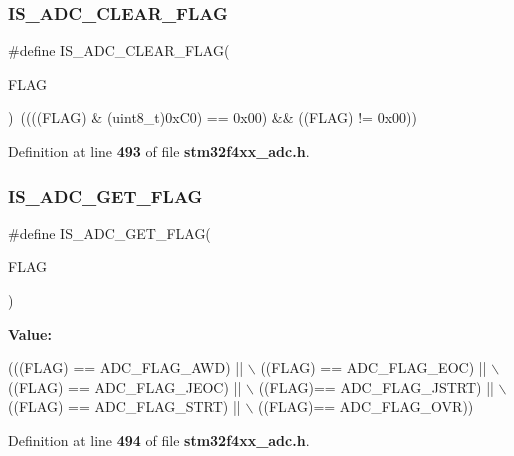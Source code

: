 \subsubsection{I\+S\+\_\+\+A\+D\+C\+\_\+\+C\+L\+E\+A\+R\+\_\+\+F\+L\+AG}
{\footnotesize\ttfamily \#define I\+S\+\_\+\+A\+D\+C\+\_\+\+C\+L\+E\+A\+R\+\_\+\+F\+L\+AG(\begin{DoxyParamCaption}\item[{}]{F\+L\+AG }\end{DoxyParamCaption})~((((F\+L\+AG) \& (uint8\+\_\+t)0x\+C0) == 0x00) \&\& ((\+F\+L\+A\+G) != 0x00))}



Definition at line \textbf{ 493} of file \textbf{ stm32f4xx\+\_\+adc.\+h}.

\mbox{\label{group__ADC__flags__definition_ga597eb68dfef9dbe0928ed14a1aedc710}} 
\subsubsection{I\+S\+\_\+\+A\+D\+C\+\_\+\+G\+E\+T\+\_\+\+F\+L\+AG}
{\footnotesize\ttfamily \#define I\+S\+\_\+\+A\+D\+C\+\_\+\+G\+E\+T\+\_\+\+F\+L\+AG(\begin{DoxyParamCaption}\item[{}]{F\+L\+AG }\end{DoxyParamCaption})}

{\bfseries Value\+:}
\begin{DoxyCode}
(((FLAG) == ADC_FLAG_AWD) || \(\backslash\)
                               ((FLAG) == ADC_FLAG_EOC) || \(\backslash\)
                               ((FLAG) == ADC_FLAG_JEOC) || \(\backslash\)
                               ((FLAG)== ADC_FLAG_JSTRT) || \(\backslash\)
                               ((FLAG) == ADC_FLAG_STRT) || \(\backslash\)
                               ((FLAG)== ADC_FLAG_OVR))
\end{DoxyCode}


Definition at line \textbf{ 494} of file \textbf{ stm32f4xx\+\_\+adc.\+h}.

